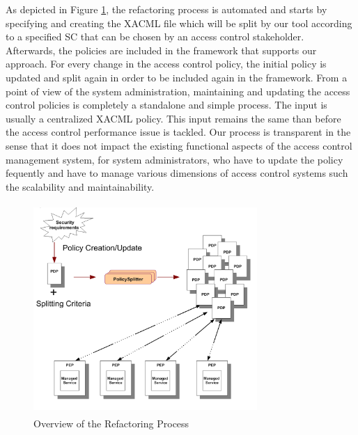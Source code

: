 As depicted in Figure \ref{overallprocess}, the refactoring process is automated and starts by specifying and creating the XACML file which 
will be split by our tool according to a specified SC that can be chosen by an access control stakeholder. Afterwards, the policies are included in the 
framework that supports our approach. For every change in the access control policy, the initial policy is updated and 
split again in order to be included again in the framework.
From a point of view of the system administration, maintaining and updating the access control policies is completely a standalone and simple
 process. The input is usually a centralized XACML policy. This input remains the same than before the access control performance issue is tackled.
Our process is transparent in the sense that it does not impact the existing functional aspects of the access control management system, 
for system administrators, who have to update the policy fequently and have to manage various dimensions of access control 
systems such the scalability and maintainability.
\begin{figure}[!h]
\begin{center}
\includegraphics[width=8.5cm, height=8cm]{Overall-process}
\caption{Overview of the Refactoring Process}
\label{overallprocess}
\end{center}
\end{figure} 
